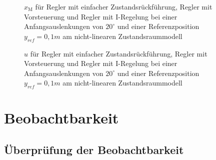 \documentclass[
	pagesize,
	fontsize=12pt,
	paper=a4,
	oneside,
   reqno
]{scrartcl}
\begin{document}
\begin{figure}[H]
    \centering
    \caption[Reglervergleich für $x_{\mathrm{M}}$ (nicht-linear)]{$x_{\mathrm{M}}$ für Regler mit einfacher Zustandsrückführung, Regler mit Vorsteuerung und Regler mit I-Regelung bei einer Anfangsauslenkungen von $20^\circ$ und einer Referenzposition $y_{ref} = 0,1 m$ am nicht-linearen Zustandsraummodell}
    \label{fig:Bild31}
\end{figure}

\begin{figure}[H]
    \centering
    \caption[Reglervergleich für $u$ (nicht-linear)]{$u$ für Regler mit einfacher Zustandsrückführung, Regler mit Vorsteuerung und Regler mit I-Regelung bei einer Anfangsauslenkungen von $20^\circ$ und einer Referenzposition $y_{ref} = 0,1 m$ am nicht-linearen Zustandsraummodell}
    \label{fig:Bild32}
\end{figure}

\clearpage

\section{Beobachtbarkeit}

\subsection{Überprüfung der Beobachtbarkeit}
\end{document}
